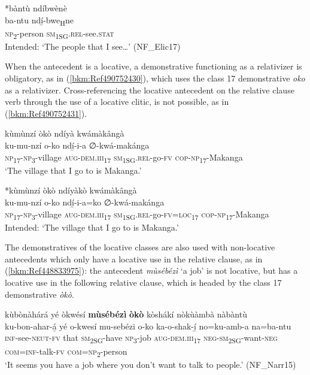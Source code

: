 \ea
\label{bkm:Ref74910063}
*bàntù ndíbwènè\\
\gll ba-ntu  ndí̲-bwe\textsubscript{H}ne\\
\textsc{np}\textsubscript{2}-person  \textsc{sm}\textsubscript{1SG}.\textsc{rel}-see.\textsc{stat}\\
\glt Intended: ‘The people that I see…’ (NF\_Elic17)
\z

When the antecedent is a locative, a demonstrative functioning as a relativizer is obligatory, as in (\ref{bkm:Ref490752430}), which uses the class 17 demonstrative \textit{oko} as a relativizer. Cross-referencing the locative antecedent on the relative clause verb through the use of a locative clitic, is not possible, as in (\ref{bkm:Ref490752431}).

\ea
\label{bkm:Ref490752430}
kùmùnzí òkò ndíyà kwámàkângà\\
\gll ku-mu-nzí    o-ko      ndí̲-i-a    ∅-kwá-makánga\\
\textsc{np}\textsubscript{17}-\textsc{np}\textsubscript{3}-village  \textsc{aug}-\textsc{dem}.\textsc{iii}\textsubscript{17}  \textsc{sm}\textsubscript{1SG}.\textsc{rel}-go-\textsc{fv}  \textsc{cop}-\textsc{np}\textsubscript{17}-Makanga\\
\glt ‘The village that I go to is Makanga.’
\z

\ea
\label{bkm:Ref490752431}
*kùmùnzí òkò ndíyàkò kwámàkângà\\
\gll ku-mu-nzí    o-ko      ndí̲-i-a=ko ∅-kwá-makánga \\
\textsc{np}\textsubscript{17}-\textsc{np}\textsubscript{3}-village  \textsc{aug}-\textsc{dem}.\textsc{iii}\textsubscript{17}  \textsc{sm}\textsubscript{1SG}.\textsc{rel}-go-\textsc{fv}=\textsc{loc}\textsubscript{17}
\textsc{cop}-\textsc{np}\textsubscript{17}-Makanga\\
\glt Intended: ‘The village that I go to is Makanga.’
\z

The demonstratives of the locative classes are also used with non-locative antecedents which only have a locative use in the relative clause, as in (\ref{bkm:Ref448833975}): the antecedent \textit{mùsébézì} ‘a job’ is not locative, but has a locative use in the following relative clause, which is headed by the class 17 demonstrative \textit{òkò}.

\ea
\label{bkm:Ref448833975}
kùbònàhárá yé òkwésí \textbf{mùsébézì} \textbf{òkò} kòshákí nòkùàmbà nàbàntù\\
\gll ku-bon-ahar-á̲  yé  o-kwesí  mu-sebézi  o-ko ka-o-shak-í̲      no=ku-amb-a  na=ba-ntu\\
\textsc{inf}-see-\textsc{neut}-\textsc{fv}  that  \textsc{sm}\textsubscript{2SG}-have  \textsc{np}\textsubscript{3}-job  \textsc{aug}-\textsc{dem}.\textsc{iii}\textsubscript{17}
\textsc{neg}-\textsc{sm}\textsubscript{2SG}-want-\textsc{neg}  \textsc{com}=\textsc{inf}-talk-\textsc{fv}  \textsc{com}=\textsc{np}\textsubscript{2}-person\\
\glt ‘It seems you have a job where you don’t want to talk to people.’ (NF\_Narr15)
\z

